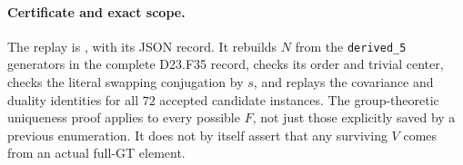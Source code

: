 \paragraph{Certificate and exact scope.}
The replay is
,
with its JSON record. It rebuilds $N$ from the
\texttt{derived\_5} generators in the complete D23.F35 record,
checks its order and trivial center, checks the literal swapping
conjugation by $s$, and replays the covariance and duality identities
for all $72$ accepted candidate instances. The group-theoretic
uniqueness proof applies to every possible $F$, not just those
explicitly saved by a previous enumeration. It does not by itself
assert that any surviving $V$ comes from an actual full-GT element.
